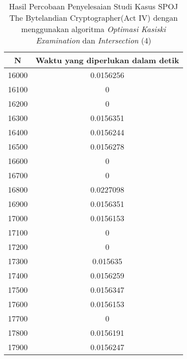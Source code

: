 \begin{table}[H]
\centering
\begin{tabular}{|c|c|}\hline
N&Waktu yang diperlukan dalam detik\\ \hline
16000&0.0156256\\ \hline
16100&0\\ \hline
16200&0\\ \hline
16300&0.0156351\\ \hline
16400&0.0156244\\ \hline
16500&0.0156278\\ \hline
16600&0\\ \hline
16700&0\\ \hline
16800&0.0227098\\ \hline
16900&0.0156351\\ \hline
17000&0.0156153\\ \hline
17100&0\\ \hline
17200&0\\ \hline
17300&0.015635\\ \hline
17400&0.0156259\\ \hline
17500&0.0156347\\ \hline
17600&0.0156153\\ \hline
17700&0\\ \hline
17800&0.0156191\\ \hline
17900&0.0156247\\ \hline
\end{tabular}
\caption {Hasil Percobaan Penyelesaian Studi Kasus SPOJ The Bytelandian Cryptographer(Act IV) dengan menggunakan algoritma \textit{Optimasi Kasiski Examination} dan \textit{Intersection} (4)}
\label{tab1:res8}
\end{table}
